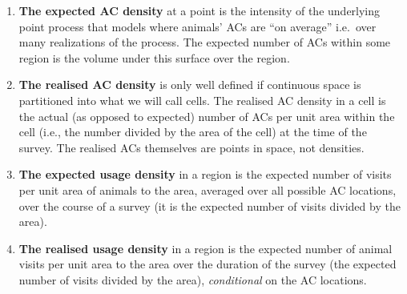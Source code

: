 \documentclass[10pt,a4paper]{article}
\begin{document}
\begin{enumerate}
\item \textbf{The expected AC density} at a point is the intensity of the underlying point process that models where animals' ACs are ``on average''  i.e.\ over many realizations of the process. %
The expected number of ACs within some region is the volume under this surface over the region.
\item \textbf{The realised AC density} is only well defined if continuous space is partitioned into what we will call cells. The realised AC density in a cell is the actual (as opposed to expected) number of ACs per unit area within the cell (i.e., the number divided by the area of the cell) at the time of the survey. The realised ACs themselves are points in space, not densities.
\item \textbf{The expected usage density} in a region is the expected number of visits per unit area of animals to the area, averaged over all possible AC locations, over the course of a survey (it is the expected number of visits divided by the area). %
\item \textbf{The realised usage density} in a region is the expected number of animal visits per unit area to the area over the duration of the survey (the expected number of visits divided by the area), \textit{conditional} on the AC locations. %
\end{enumerate}
\end{document}
